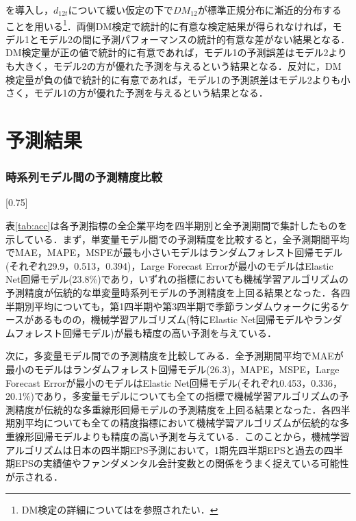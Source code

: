 \documentclass[a4paper，12pt]{jsarticle}
\begin{document}
\noindent
を導入し，$d_{12t}$について緩い仮定の下で$DM_{12}$が標準正規分布に漸近的分布することを用いる\footnote{DM検定の詳細については\cite{diebold2002comparing}を参照されたい．}．両側DM検定で統計的に有意な検定結果が得られなければ，モデル1とモデル2の間に予測パフォーマンスの統計的有意な差がない結果となる．DM検定量が正の値で統計的に有意であれば，モデル1の予測誤差はモデル2よりも大きく，モデル2の方が優れた予測を与えるという結果となる．反対に，DM検定量が負の値で統計的に有意であれば，モデル1の予測誤差はモデル2よりも小さく，モデル1の方が優れた予測を与えるという結果となる．

\part{予測結果} \label{par:result}

\section{時系列モデル間の予測精度比較}

\begin{landscape}
\begin{table}
  \caption{統計的・機械的な手法による1期先四半期EPS予測の精度(1,003社平均)}
  \label{tab:acc}
  \scalebox{0.75}[0.75]{
    
  }
\end{table}
\end{landscape}

表\ref{tab:acc}は各予測指標の全企業平均を四半期別と全予測期間で集計したものを示している．まず，単変量モデル間での予測精度を比較すると，全予測期間平均でMAE，MAPE，MSPEが最も小さいモデルはランダムフォレスト回帰モデル(それぞれ29.9，0.513，0.394)，Large Forecast Errorが最小のモデルはElastic Net回帰モデル(23.8\%)であり，いずれの指標においても機械学習アルゴリズムの予測精度が伝統的な単変量時系列モデルの予測精度を上回る結果となった．各四半期別平均についても，第1四半期や第3四半期で季節ランダムウォークに劣るケースがあるものの，機械学習アルゴリズム(特にElastic Net回帰モデルやランダムフォレスト回帰モデル)が最も精度の高い予測を与えている．

次に，多変量モデル間での予測精度を比較してみる．全予測期間平均でMAEが最小のモデルはランダムフォレスト回帰モデル(26.3)，MAPE，MSPE，Large Forecast Errorが最小のモデルはElastic Net回帰モデル(それぞれ0.453，0.336，20.1\%)であり，多変量モデルについても全ての指標で機械学習アルゴリズムの予測精度が伝統的な多重線形回帰モデルの予測精度を上回る結果となった．各四半期別平均についても全ての精度指標において機械学習アルゴリズムが伝統的な多重線形回帰モデルよりも精度の高い予測を与えている．このことから，機械学習アルゴリズムは日本の四半期EPS予測において，1期先四半期EPSと過去の四半期EPSの実績値やファンダメンタル会計変数との関係をうまく捉えている可能性が示される．
\end{document}
